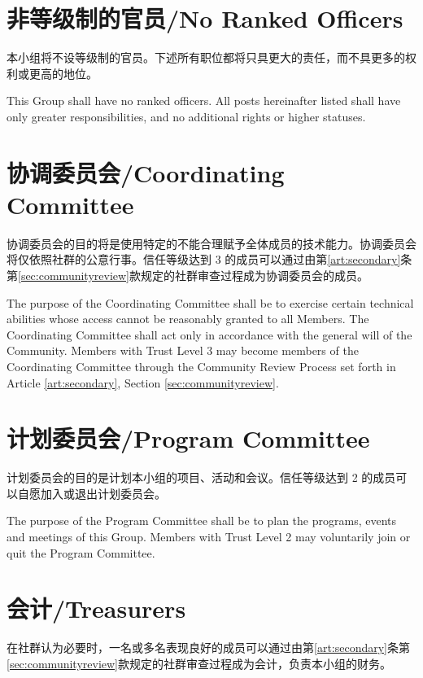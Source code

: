 \documentclass[12pt]{aspasia-constitution}
\begin{document}
	
	\section{非等级制的官员/No Ranked Officers} \label{sec:norankedofficers}
	
	本小组将不设等级制的官员。下述所有职位都将只具更大的责任，而不具更多的权利或更高的地位。
	
	This Group shall have no ranked officers. All posts hereinafter listed shall have only greater responsibilities, and no additional rights or higher statuses.
	
	\section{协调委员会/Coordinating Committee} \label{sec:coordinating}
	
	协调委员会的目的将是使用特定的不能合理赋予全体成员的技术能力。协调委员会将仅依照社群的公意行事。信任等级达到 3 的成员可以通过由第\ref{art:secondary}条第\ref{sec:communityreview}款规定的社群审查过程成为协调委员会的成员。
	
	The purpose of the Coordinating Committee shall be to exercise certain technical abilities whose access cannot be reasonably granted to all Members. The Coordinating Committee shall act only in accordance with the general will of the Community. Members with Trust Level 3 may become members of the Coordinating Committee through the Community Review Process set forth in Article \ref{art:secondary}, Section \ref{sec:communityreview}.
	
	\section{计划委员会/Program Committee} \label{sec:program}
	
	计划委员会的目的是计划本小组的项目、活动和会议。信任等级达到 2 的成员可以自愿加入或退出计划委员会。
	
	The purpose of the Program Committee shall be to plan the programs, events and meetings of this Group. Members with Trust Level 2 may voluntarily join or quit the Program Committee.
	
	\section{会计/Treasurers} \label{sec:treasurers}
	
	在社群认为必要时，一名或多名表现良好的成员可以通过由第\ref{art:secondary}条第\ref{sec:communityreview}款规定的社群审查过程成为会计，负责本小组的财务。
	
\end{document}

